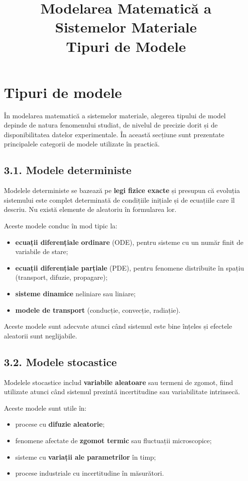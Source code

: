 \documentclass[12pt,a4paper]{article}
\title{Modelarea Matematică a Sistemelor Materiale \\ \large Tipuri de Modele}
\author{}
\date{}
\begin{document}
\maketitle

\section{Tipuri de modele}

În modelarea matematică a sistemelor materiale, alegerea tipului de model depinde de natura fenomenului studiat, de nivelul de precizie dorit și de disponibilitatea datelor experimentale. În această secțiune sunt prezentate principalele categorii de modele utilizate în practică.

\subsection{3.1. Modele deterministe}

Modelele deterministe se bazează pe \textbf{legi fizice exacte} și presupun că evoluția sistemului este complet determinată de condițiile inițiale și de ecuațiile care îl descriu. Nu există elemente de aleatoriu în formularea lor.

Aceste modele conduc în mod tipic la:
\begin{itemize}
    \item \textbf{ecuații diferențiale ordinare} (ODE), pentru sisteme cu un număr finit de variabile de stare;
    \item \textbf{ecuații diferențiale parțiale} (PDE), pentru fenomene distribuite în spațiu (transport, difuzie, propagare);
    \item \textbf{sisteme dinamice} neliniare sau liniare;
    \item \textbf{modele de transport} (conducție, convecție, radiație).
\end{itemize}

Aceste modele sunt adecvate atunci când sistemul este bine înțeles și efectele aleatorii sunt neglijabile.

\subsection{3.2. Modele stocastice}

Modelele stocastice includ \textbf{variabile aleatoare} sau termeni de zgomot, fiind utilizate atunci când sistemul prezintă incertitudine sau variabilitate intrinsecă.

Aceste modele sunt utile în:
\begin{itemize}
    \item procese cu \textbf{difuzie aleatorie};
    \item fenomene afectate de \textbf{zgomot termic} sau fluctuații microscopice;
    \item sisteme cu \textbf{variații ale parametrilor} în timp;
    \item procese industriale cu incertitudine în măsurători.
\end{itemize}
\end{document}
